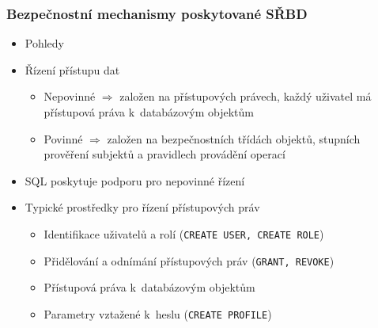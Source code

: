 \documentclass[a4paper,10pt]{article}
\newcommand{\tedy}{$\Rightarrow$ }
\begin{document}
			\subsubsection{Bezpečnostní mechanismy poskytované SŘBD}
				\begin{itemize}
					\item Pohledy
					\item Řízení přístupu dat
					\begin{itemize}
						\item Nepovinné \tedy založen na přístupových právech, každý uživatel má přístupová práva k~databázovým objektům
						\item Povinné \tedy založen na bezpečnostních třídách objektů, stupních prověření subjektů a pravidlech provádění operací
					\end{itemize}
					\item SQL poskytuje podporu pro nepovinné řízení
					\item Typické prostředky pro řízení přístupových práv
					\begin{itemize}
						\item Identifikace uživatelů a rolí (\texttt{CREATE USER, CREATE ROLE})
						\item Přidělování a odnímání přístupových práv (\texttt{GRANT, REVOKE})
						\item Přístupová práva k~databázovým objektům
						\item Parametry vztažené k~heslu (\texttt{CREATE PROFILE})
					\end{itemize}
				\end{itemize}
		
\end{document}
